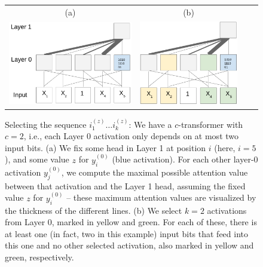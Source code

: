 \documentclass[11pt,a4paper]{article}
\begin{document}
\begin{figure}[ht]
    \centering
    \begin{tabular}{cccc}
    (a) & (b) \\
    \includegraphics[height=0.1\textheight]{writeup/figures/select-1.png} &
        \includegraphics[height=0.1\textheight]{writeup/figures/select-2.png}&
        \end{tabular}
	\caption{Selecting the sequence $i_{1}^{(z)} \dots i_{k}^{(z)}$: We have a $c$-transformer with $c=2$, i.e., each Layer 0 activation only depends on at most two input bits.
	(a)  We fix some head in Layer 1 at position $i$ (here, $i=5$), and some value $z$ for $y^{(0)}_i$ (blue activation). For each other layer-0 activation $y^{(0)}_j$, we compute the maximal possible attention value between that activation and the Layer 1 head, assuming the fixed value $z$ for $y^{(0)}_i$ -- these maximum attention values are visualized by the thickness of the different lines.
	(b) We select $k = 2$ activations from Layer 0, marked in yellow and green. For each of these, there is at least one (in fact, two in this example) input bits that feed into this one and no other selected activation, also marked in yellow and green, respectively.}
	\label{fig:selecting}
\end{figure}
\end{document}
